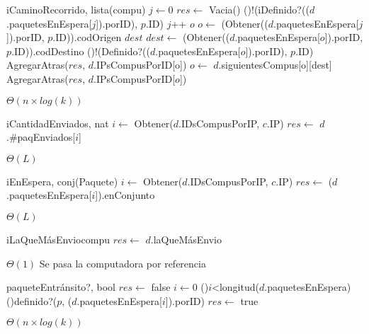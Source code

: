 \begin{Algoritmos}
  \begin{algoritmo}{iCaminoRecorrido}{, }{lista(compu)}
     $j \gets 0$
    $res \gets$ Vacia()
    \While(){!(iDefinido?(($d$.paquetesEnEspera[$j$]).porID), $p$.ID)}{
      $j$++
    }
     $o$
    $o \gets$ (Obtener(($d$.paquetesEnEspera[$j$]).porID, $p$.ID)).codOrigen
     $dest$
    $dest \gets$ (Obtener(($d$.paquetesEnEspera[$o$]).porID, $p$.ID)).codDestino
    \While(){!(Definido?(($d$.paquetesEnEspera[$o$]).porID), $p$.ID)}{
      AgregarAtras($res$, $d$.IPsCompusPorID[o])
      $o \gets$ $d$.siguientesCompus[o][dest]
    }
    AgregarAtras($res$, $d$.IPsCompusPorID[$o$])
  \end{algoritmo} 
  \datosAlgoritmo{} %
  {} %
  {} %
  {$\Theta(n \times log(k))$} %
  {} %

  \begin{algoritmo}{iCantidadEnviados}{, }{nat}
     $i \gets$ Obtener($d$.IDsCompusPorIP, $c$.IP)
    $res \gets$ $d$.\#paqEnviados[$i$]
  \end{algoritmo}
 \datosAlgoritmo{} %
  {} %
  {} %
  {$\Theta(L)$} %
  {} %

  \begin{algoritmo}{iEnEspera}{, }{conj(Paquete)}
     $i \gets$ Obtener($d$.IDsCompusPorIP, $c$.IP)
    $res \gets$ ($d$.paquetesEnEspera[$i$]).enConjunto
  \end{algoritmo}
 \datosAlgoritmo{} %
  {} %
  {} %
  {$\Theta(L)$} %
  {} %

  \begin{algoritmo}{iLaQueM\'{a}sEnvio}{}{compu}
    $res \gets$ $d$.laQueM\'{a}sEnvio 
  \end{algoritmo}
  \datosAlgoritmo{} %
  {} %
  {} %
  {$\Theta(1)$} %
  {Se pasa la computadora por referencia} %

  \begin{algoritmo}{paqueteEntr\'{a}nsito?}{, }{bool}
    $res \gets$ false 
     $i \gets 0$
    \While(){$i$<longitud($d$.paquetesEnEspera)}{
      \If(){definido?($p$, ($d$.paquetesEnEspera[$i$]).porID)}{
          $res \gets$ true
      }
    }
  \end{algoritmo}
  \datosAlgoritmo{} %
  {} %
  {} %
  {$\Theta(n \times log(k))$} %
  {} %

\end{Algoritmos}


